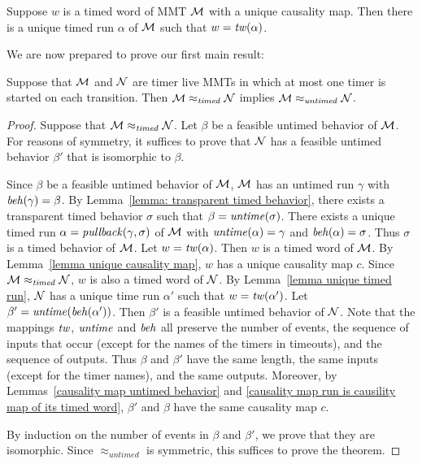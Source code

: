 \begin{lemma}
\label{lemma unique timed run}
Suppose $w$ is a timed word of MMT ${\mathcal M}$ with a unique causality map.
Then there is a unique timed run $\alpha$ of ${\mathcal M}$ such that $w = \mathit{tw}(\alpha)$.
\end{lemma}

\fi
We are now prepared to prove our first main result:

\begin{theorem}
\label{timedimpliesuntimed}
Suppose that ${\mathcal M}$ and ${\mathcal N}$ are timer live MMTs in which at most one timer is started on each transition. Then
${\mathcal M} \approx_{\mathit{timed}} {\mathcal N}$
implies
${\mathcal M} \approx_{\mathit{untimed}} {\mathcal N}$.
\end{theorem}
\iflong
\begin{proof}
Suppose that ${\mathcal M} \approx_{\mathit{timed}} {\mathcal N}$.
Let $\beta$ be a feasible untimed behavior of ${\mathcal M}$.
For reasons of symmetry, it suffices to prove that ${\mathcal N}$ has a feasible untimed behavior $\beta'$ that is isomorphic to $\beta$.

Since $\beta$ be a feasible untimed behavior of ${\mathcal M}$, ${\mathcal M}$ has an untimed run $\gamma$ with $\mathit{beh}(\gamma) = \beta$.
By Lemma~\ref{lemma: transparent timed behavior}, there exists a 
transparent timed behavior $\sigma$ such that $\beta = \mathit{untime}(\sigma)$.
There exists a unique timed run $\alpha = \mathit{pullback}(\gamma,\sigma)$ of ${\mathcal M}$ with $\mathit{untime}(\alpha) = \gamma$ and $\mathit{beh}(\alpha) = \sigma$.
Thus $\sigma$ is a timed behavior of ${\mathcal M}$.
Let  $w = \mathit{tw}(\alpha)$.
Then $w$ is a timed word of ${\mathcal M}$.
By Lemma~\ref{lemma unique causality map}, $w$ has a unique causality map $c$.
Since ${\mathcal M} \approx_{\mathit{timed}} {\mathcal N}$, $w$ is also a timed word of ${\mathcal N}$.
By Lemma~\ref{lemma unique timed run}, ${\mathcal N}$ has a unique time run $\alpha'$ such that $w = \mathit{tw}(\alpha')$.
Let $\beta' = \mathit{untime}(\mathit{beh}(\alpha'))$.
Then $\beta'$ is a feasible untimed behavior of ${\mathcal N}$.
Note that the mappings $\mathit{tw}$, $\mathit{untime}$ and $\mathit{beh}$ all preserve the number of events, the sequence of inputs that occur (except for the names of the timers in timeouts), and the sequence of outputs. Thus $\beta$ and $\beta'$ have the same length, the same inputs (except for the timer names), and the same outputs.
Moreover, by Lemmas~\ref{causality map untimed behavior} and \ref{causality map run is causility map of its timed word},
$\beta'$ and $\beta$ have the same causality map $c$.

By induction on the number of events in $\beta$ and $\beta'$, we prove that they are isomorphic.
Since $\approx_{\mathit{untimed}}$ is symmetric, this suffices to prove the theorem.


\end{proof}
